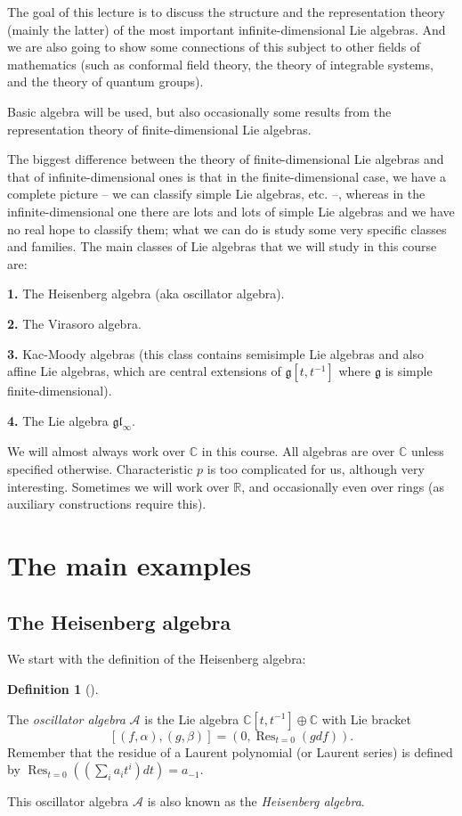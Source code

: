 \documentclass
[numbers=enddot,12pt,final,onecolumn,german,notitlepage]{scrartcl}%
\theoremstyle{definition}
\newtheorem{defi}[theo]{Definition}
\newenvironment{definition}[1][]
{\begin{defi}[#1]\begin{leftbar}}
{\end{leftbar}\end{defi}}
\begin{document}
The goal of this lecture is to discuss the structure and the representation
theory (mainly the latter) of the most important infinite-dimensional Lie
algebras. And we are also going to show some connections of this subject to
other fields of mathematics (such as conformal field theory, the theory of
integrable systems, and the theory of quantum groups).

Basic algebra will be used, but also occasionally some results from the
representation theory of finite-dimensional Lie algebras.

The biggest difference between the theory of finite-dimensional Lie algebras
and that of infinite-dimensional ones is that in the finite-dimensional case,
we have a complete picture -- we can classify simple Lie algebras, etc. --,
whereas in the infinite-dimensional one there are lots and lots of simple Lie
algebras and we have no real hope to classify them; what we can do is study
some very specific classes and families. The main classes of Lie algebras that
we will study in this course are:

\textbf{1.} The Heisenberg algebra (aka oscillator algebra).

\textbf{2.} The Virasoro algebra.

\textbf{3.} Kac-Moody algebras (this class contains semisimple Lie algebras
and also affine Lie algebras, which are central extensions of $\mathfrak{g}%
\left[  t,t^{-1}\right]  $ where $\mathfrak{g}$ is simple finite-dimensional).

\textbf{4.} The Lie algebra $\mathfrak{gl}_{\infty}$.

We will almost always work over $\mathbb{C}$ in this course. All algebras are
over $\mathbb{C}$ unless specified otherwise. Characteristic $p$ is too
complicated for us, although very interesting. Sometimes we will work over
$\mathbb{R}$, and occasionally even over rings (as auxiliary constructions
require this).

\section{The main examples}

\subsection{The Heisenberg algebra}

We start with the definition of the Heisenberg algebra:

\begin{definition}
\label{def.osc}The \textit{oscillator algebra} $\mathcal{A}$ is the Lie
algebra $\mathbb{C}\left[  t,t^{-1}\right]  \oplus\mathbb{C}$ with Lie bracket%
\[
\left[  \left(  f,\alpha\right)  ,\left(  g,\beta\right)  \right]  =\left(
0,\operatorname*{Res}\nolimits_{t=0}\left(  gdf\right)  \right)  .
\]
Remember that the residue of a Laurent polynomial (or Laurent series) is
defined by $\operatorname*{Res}\nolimits_{t=0}\left(  \left(  \sum
\limits_{i}a_{i}t^{i}\right)  dt\right)  =a_{-1}$.

This oscillator algebra $\mathcal{A}$ is also known as the \textit{Heisenberg
algebra}.
\end{definition}
\end{document}
